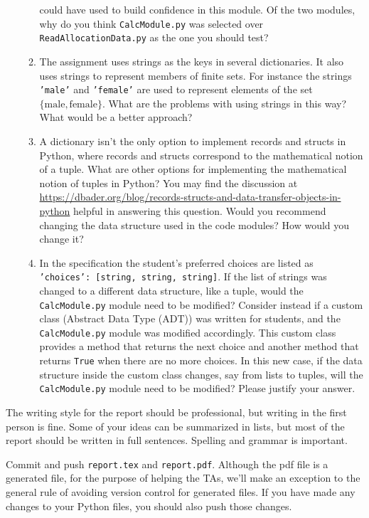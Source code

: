 \documentclass[12pt]{article}
\begin{document}
\begin{enumerate}
\begin{enumerate}
  could have used to build confidence in this module.  Of the two modules, why
  do you think \texttt{CalcModule.py} was selected over
  \texttt{ReadAllocationData.py} as the one you should test?
\item The assignment uses strings as the keys in several dictionaries.  It also
  uses strings to represent members of finite sets.  For instance the strings
  \texttt{'male'} and \texttt{'female'} are used to represent elements of
  the set $\{ \text{male}, \text{female} \}$.  What are the problems with using
  strings in this way?  What would be a better approach?
\item A dictionary isn't the only option to implement records and structs in
  Python, where records and structs correspond to the mathematical notion of a
  tuple.  What are other options for implementing the mathematical notion of tuples
  in Python?  You may find the discussion at
  \url{https://dbader.org/blog/records-structs-and-data-transfer-objects-in-python}
  helpful in answering this question.  Would you recommend changing the data
  structure used in the code modules?  How would you change it?
\item In the specification the student's preferred choices are listed as
  \texttt{'choices': [string, string, string]}.  If the list of strings was
  changed to a different data structure, like a tuple, would the
  \texttt{CalcModule.py} module need to be modified?  Consider instead if a
  custom class (Abstract Data Type (ADT)) was written for students, and the
  \texttt{CalcModule.py} module was modified accordingly.  This custom class
  provides a method that returns the next choice and another method that returns
  \texttt{True} when there are no more choices.  In this new case, if the data
  structure inside the custom class changes, say from lists to tuples, will the
  \texttt{CalcModule.py} module need to be modified?  Please justify your
  answer.
\end{enumerate}
\end{enumerate}

The writing style for the report should be professional, but writing in the
first person is fine.  Some of your ideas can be summarized in lists, but most
of the report should be written in full sentences.  Spelling and grammar is
important.

Commit and push \texttt {report.tex} and \texttt{report.pdf}.  Although the pdf
file is a generated file, for the purpose of helping the TAs, we'll make an
exception to the general rule of avoiding version control for generated files.
If you have made any changes to your Python files, you should also push those
changes.
\end{document}
